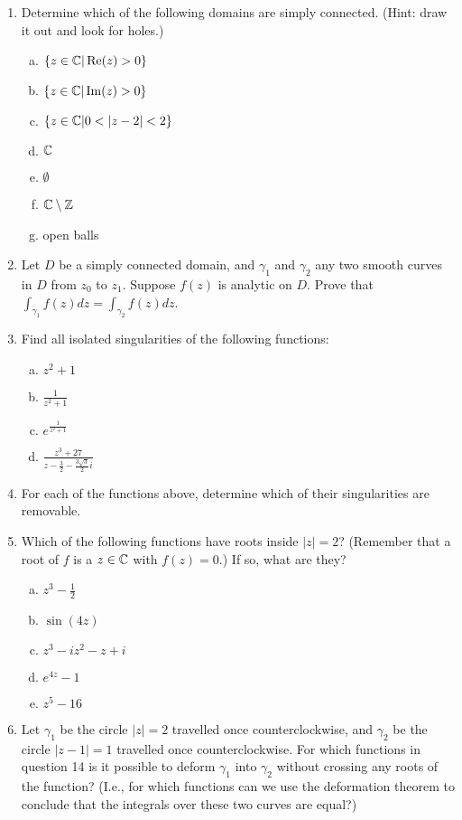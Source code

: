 \begin{enumerate}
\item Determine which of the following domains are simply connected. (Hint: draw it out and look for holes.)

\begin{enumerate}[a)]
\item $\{z \in \mathbb{C}| \operatorname{Re}(z) > 0\}$ 
\item $\{z \in \mathbb{C}| \operatorname{Im}(z) > 0\}$
\item $\{z \in \mathbb{C}| 0 < |z - 2| < 2\}$
\item $\mathbb{C}$
\item $\emptyset$
\item $\mathbb{C} \setminus \mathbb{Z}$
\item open balls
\end{enumerate}


\item Let $D$ be a simply connected domain, and $\gamma_1$ and $\gamma_2$ any two smooth curves in $D$ from $z_0$ to $z_1$. Suppose $f(z)$ is analytic on $D$. Prove that $\int_{\gamma_1} f(z)dz = \int_{\gamma_2}f(z)dz$.

\item Find all isolated singularities of the following functions:

\begin{enumerate}[a)]
\item $z^2 + 1$
\item $\frac{1}{z^2+1}$
\item $e^{\frac{1}{z^2 + 1}}$
\item $\frac{z^3 + 27}{z- \frac{3}{2} - \frac{3\sqrt{3}}{2}i}$
\end{enumerate}

\item For each of the functions above, determine which of their singularities are removable.

\item Which of the following functions have roots inside $|z| = 2$? (Remember that a root of $f$ is a $z\in \mathbb{C}$ with $f(z) = 0$.) If so, what are they?

\begin{enumerate}[a)]
\item $z^3 - \frac{1}{2}$
\item $\sin(4z)$
\item $z^3 - iz^2 - z + i$
\item $e^{4z} - 1$
\item $z^5 - 16$
\end{enumerate}


\item Let $\gamma_1$ be the circle $|z| = 2$ travelled once counterclockwise, and $\gamma_2$ be the circle $|z-1| = 1$ travelled once counterclockwise. For which functions in question 14 is it possible to deform $\gamma_1$ into $\gamma_2$ without crossing any roots of the function? (I.e., for which functions can we use the deformation theorem to conclude that the integrals over these two curves are equal?)



\end{enumerate}
